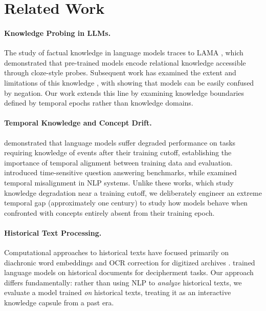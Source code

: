 \documentclass[11pt]{article}
\begin{document}
\section{Related Work}

\paragraph{Knowledge Probing in LLMs.} The study of factual knowledge in language models traces to LAMA \cite{petroni2019language}, which demonstrated that pre-trained models encode relational knowledge accessible through cloze-style probes. Subsequent work has examined the extent and limitations of this knowledge \cite{roberts2020much,jiang2020know}, with \citet{kassner2020negated} showing that models can be easily confused by negation. Our work extends this line by examining knowledge boundaries defined by temporal epochs rather than knowledge domains.

\paragraph{Temporal Knowledge and Concept Drift.} \citet{lazaridou2021mind} demonstrated that language models suffer degraded performance on tasks requiring knowledge of events after their training cutoff, establishing the importance of temporal alignment between training data and evaluation. \citet{dhingra2022time} introduced time-sensitive question answering benchmarks, while \citet{luu2022time} examined temporal misalignment in NLP systems. Unlike these works, which study knowledge degradation near a training cutoff, we deliberately engineer an extreme temporal gap (approximately one century) to study how models behave when confronted with concepts entirely absent from their training epoch.

\paragraph{Historical Text Processing.} Computational approaches to historical texts have focused primarily on diachronic word embeddings \cite{hamilton2016diachronic,kutuzov2018diachronic} and OCR correction for digitized archives \cite{rigaud2019icdar}. \citet{denigma2022} trained language models on historical documents for decipherment tasks. Our approach differs fundamentally: rather than using NLP to \textit{analyze} historical texts, we evaluate a model trained \textit{on} historical texts, treating it as an interactive knowledge capsule from a past era.
\end{document}
